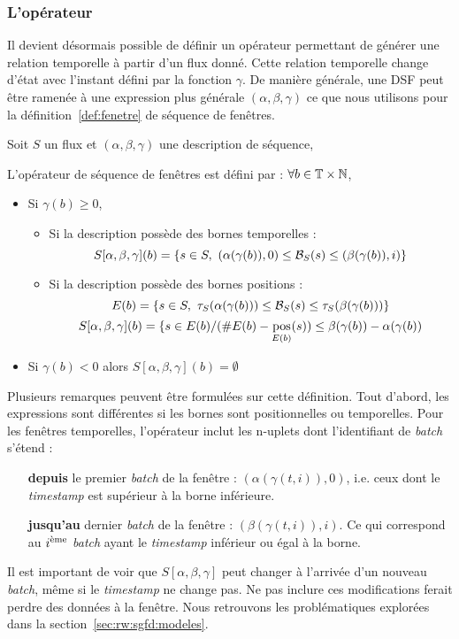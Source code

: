 \subsubsection{L'opérateur}
Il devient désormais possible de définir un opérateur permettant de générer une relation temporelle à partir d'un flux donné. Cette relation temporelle change d'état avec l'instant défini par la fonction $\gamma$. De manière générale, une DSF peut être ramenée à une expression plus générale $(\alpha,\beta,\gamma)$ ce que nous utilisons pour la définition~\ref{def:fenetre} de séquence de fenêtres.
\begin{defi}\label{def:fenetre}
	Soit $S$ un flux et $(\alpha, \beta, \gamma)$ une description de séquence,
	
	L'opérateur de séquence de fenêtres est défini par : $\forall b \in \mathbb{T}\times\mathbb{N}$, 
	\begin{itemize}
		\item Si $\gamma(b) \geq 0$, 
		\begin{itemize}
			\item Si la description possède des bornes temporelles :
			$$S[\alpha,\beta,\gamma](b) = \left\{s\in S, \ (\alpha(\gamma(b)),0)\leq \BS(s) \leq (\beta(\gamma(b)),i)\right\}$$
			\item Si la description possède des bornes positions :
			$$E(b) = \left\{s\in S, \ \tau_S(\alpha(\gamma(b)))\leq \BS(s) \leq \tau_S(\beta(\gamma(b)))\right\}$$
			$$S[\alpha,\beta,\gamma](b) = \{s \in E(b) / (\#E(b) - \mathop{\mathrm{pos}}_{E(b)}(s)) \leq \beta(\gamma(b)) - \alpha(\gamma(b))$$
		\end{itemize}
		\item Si $\gamma(b) <0$ alors $S[\alpha,\beta,\gamma](b) = \emptyset$
	\end{itemize}
\end{defi}

Plusieurs remarques peuvent être formulées sur cette définition. Tout d'abord, les expressions sont différentes si les bornes sont positionnelles ou temporelles. Pour les fenêtres temporelles, l'opérateur inclut les n-uplets dont l'identifiant de \textit{batch} s'étend :
\begin{itemize}
	\item[\textbf{depuis}] le premier \textit{batch} de la fenêtre : $(\alpha(\gamma(t,i)),0)$, i.e. ceux dont le \textit{timestamp} est supérieur à la borne inférieure.
	\item[\textbf{jusqu'au}] dernier \textit{batch} de la fenêtre : $(\beta(\gamma(t,i)),i)$. Ce qui correspond au $i^{\textrm{\`{e}me}}$ \textit{batch} ayant le \textit{timestamp} inférieur ou égal à la borne.
\end{itemize}
Il est important de voir que $S[\alpha,\beta,\gamma]$ peut changer à l'arrivée d'un nouveau \textit{batch}, même si le \textit{timestamp} ne change pas. Ne pas inclure ces modifications ferait perdre des données à la fenêtre. Nous retrouvons les problématiques explorées dans la section~\ref{sec:rw:sgfd:modeles}.

